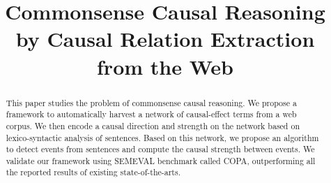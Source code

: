 \documentclass{article}
\title{Commonsense Causal Reasoning by Causal Relation Extraction
from the Web
}
\newcommand{\ZY}[1]{\textcolor{red}{Jessie: #1}}
\begin{document}
\maketitle

\begin{abstract}
This paper studies the problem of commonsense causal reasoning. We
propose a framework to automatically harvest a network of
causal-effect terms from a web corpus. We then encode a causal
direction and strength on the network based on lexico-syntactic
analysis of sentences. Based on this network, we propose an
algorithm to detect events from sentences and compute the causal
strength between events. We validate our framework using SEMEVAL
benchmark called COPA, outperforming all the reported results of
existing state-of-the-arts.
\end{abstract}












\end{document}
